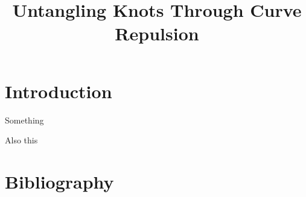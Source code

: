 \documentclass[a4paper, 12pt]{article}
\title{Untangling Knots Through Curve Repulsion}
\begin{document}

\section{Introduction}


Something \cite{YSC2021}

Also this \cite{BO1995}

\section{Bibliography}
\printbibliography
\end{document}
